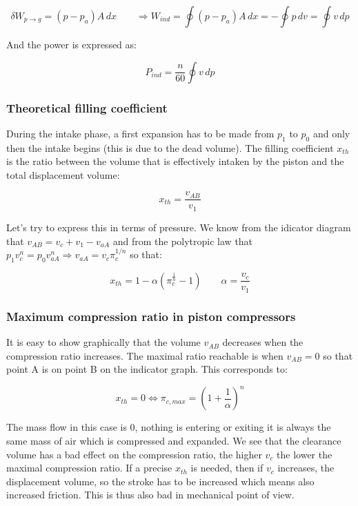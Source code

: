 \begin{equation}
\delta W_{p\rightarrow g} = (p-p_a) A\, dx \qquad \Rightarrow W_{ind} = \oint (p-p_a)A\, dx = -\oint p\, dv = \oint v \, dp
\end{equation}

And the power is expressed as: 

\begin{equation}
P_{ind}= \frac{n}{60}\oint v\, dp
\end{equation}

\subsubsection{Theoretical filling coefficient}
During the intake phase, a first expansion has to be made from $p_1$ to $p_0$ and only then the intake begins (this is due to the dead volume). The filling coefficient $x_{th}$ is the ratio between the volume that is effectively intaken by the piston and the total displacement volume: 

\begin{equation}
x_{th} = \frac{v_{AB}}{v_1}
\end{equation}

Let's try to express this in terms of pressure. We know from the idicator diagram that $v_{AB} = v_c + v_1 - v_{aA}$ and from the polytropic law that $p_1 v_c^n = p_0 v_{aA}^n \Rightarrow v_{aA} = v_c\pi _c^{1/n}$ so that: 

\begin{equation}
x_{th} = 1 - \alpha \left( \pi _c^{\frac{1}{n}} -1 \right) \qquad \alpha = \frac{v_c}{v_1}
\end{equation}

\subsubsection{Maximum compression ratio in piston compressors}
It is easy to show graphically that the volume $v_{AB}$ decreases when the compression ratio increases. The maximal ratio reachable is when $v_{AB} = 0$ so that point A is on point B on the indicator graph. This corresponds to: 

\begin{equation}
x_{th} = 0 \Leftrightarrow \pi_{c,max} = \left(1 + \frac{1}{\alpha}\right)^n
\end{equation}

The mass flow in this case is 0, nothing is entering or exiting it is always the same mass of air which is compressed and expanded. We see that the clearance volume has a bad effect on the compression ratio, the higher $v_c$ the lower the maximal compression ratio. If a precise $x_{th}$ is needed, then if $v_c$ increases, the displacement volume, so the stroke has to be increased which means also increased friction. This is thus also bad in mechanical point of view. 


